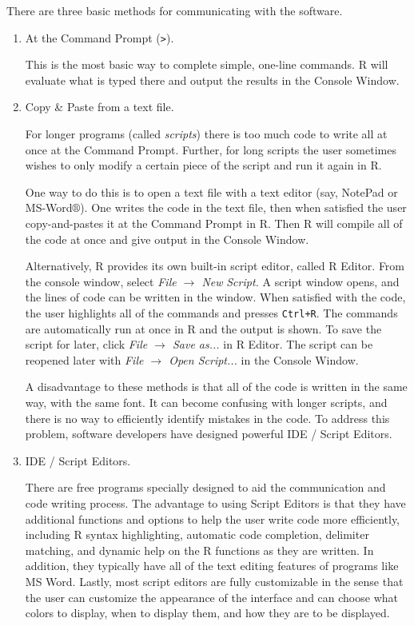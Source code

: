 \documentclass[english]{article}
\begin{document}
There are three basic methods for communicating with the software.
\begin{enumerate}
\item At the Command Prompt (\texttt{>}).


This is the most basic way to complete simple, one-line commands.
\textsf{R} will evaluate what is typed there and output the results
in the Console Window.

\item Copy \& Paste from a text file.


For longer programs (called \emph{scripts}) there is too much code
to write all at once at the Command Prompt. Further, for long scripts
the user sometimes wishes to only modify a certain piece of the script
and run it again in \textsf{R}. 


One way to do this is to open a text file with a text editor (say,
NotePad or MS-Word$\circledR$). One writes the code in the text file,
then when satisfied the user copy-and-pastes it at the Command Prompt
in \textsf{R}. Then \textsf{R} will compile all of the code at once
and give output in the Console Window. 


Alternatively, \textsf{R} provides its own built-in script editor,
called \textsf{R} Editor. From the console window, select \emph{File
$\rightarrow$ New} \emph{Script.} A script window opens, and the
lines of code can be written in the window. When satisfied with the
code, the user highlights all of the commands and presses \texttt{Ctrl+R}.
The commands are automatically run at once in \textsf{R} and the output
is shown. To save the script for later, click \emph{File $\rightarrow$
Save as...} in \textsf{R} Editor. The script can be reopened later
with \emph{File $\rightarrow$ Open Script...} in the Console Window.


A disadvantage to these methods is that all of the code is written
in the same way, with the same font. It can become confusing with
longer scripts, and there is no way to efficiently identify mistakes
in the code. To address this problem, software developers have designed
powerful IDE / Script Editors.

\item IDE / Script Editors.


There are free programs specially designed to aid the communication
and code writing process. The advantage to using Script Editors is
that they have additional functions and options to help the user write
code more efficiently, including \textsf{R} syntax highlighting, automatic
code completion, delimiter matching, and dynamic help on the \textsf{R}
functions as they are written. In addition, they typically have all
of the text editing features of programs like MS Word. Lastly, most
script editors are fully customizable in the sense that the user can
customize the appearance of the interface and can choose what colors
to display, when to display them, and how they are to be displayed.



\end{enumerate}
\end{document}
